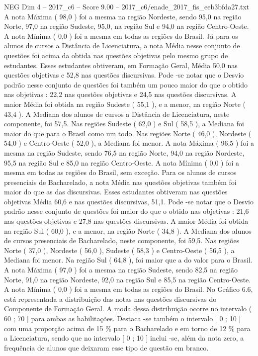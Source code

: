 \begin{textsample}{NEG Dim 4 – 2017\_c6 – Score 9.00 – 2017\_c6/enade\_2017\_fis\_eeb3bfda27.txt}
A nota Máxima ( 98,0 ) foi a mesma na região Nordeste, sendo 95,0 na região Norte, 97,0 na região Sudeste, 95,0, na região Sul e 94,0 na região Centro-Oeste.
A nota Mínima ( 0,0 ) foi a mesma em todas as regiões do Brasil.
Já para os alunos de cursos a Distância de Licenciatura, a nota Média nesse conjunto de questões foi acima da obtida nas questões objetivas pelo mesmo grupo de estudantes.
Esses estudantes obtiveram, em Formação Geral, Média 50,0 nas questões objetivas e 52,8 nas questões discursivas.
Pode -se notar que o Desvio padrão nesse conjunto de questões foi também um pouco maior do que o obtido nas objetivas : 22,2 nas questões objetivas e 24,5 nas questões discursivas.
A maior Média foi obtida na região Sudeste ( 55,1 ), e a menor, na região Norte ( 43,4 ).
A Mediana dos alunos de cursos a Distância de Licenciatura, neste componente, foi 57,5.
Nas regiões Sudeste ( 62,0 ) e Sul ( 58,5 ), a Mediana foi maior do que para o Brasil como um todo.
Nas regiões Norte ( 46,0 ), Nordeste ( 54,0 ) e Centro-Oeste ( 52,0 ), a Mediana foi menor.
A nota Máxima ( 96,5 ) foi a mesma na região Sudeste, sendo 76,5 na região Norte, 94,0 na região Nordeste, 95,5 na região Sul e 85,0 na região Centro-Oeste.
A nota Mínima ( 0,0 ) foi a mesma em todas as regiões do Brasil, sem exceção.
Para os alunos de cursos presenciais de Bacharelado, a nota Média nas questões objetivas também foi maior do que as das discursivas.
Esses estudantes obtiveram nas questões objetivas Média 60,6 e nas questões discursivas, 51,1.
Pode -se notar que o Desvio padrão nesse conjunto de questões foi maior do que o obtido nas objetivas : 21,6 nas questões objetivas e 27,8 nas questões discursivas.
A maior Média foi obtida na região Sul ( 60,0 ), e a menor, na região Norte ( 34,8 ).
A Mediana dos alunos de cursos presenciais de Bacharelado, neste componente, foi 59,5.
Nas regiões Norte ( 37,0 ), Nordeste ( 56,0 ), Sudeste ( 58,3 ) e Centro-Oeste ( 56,5 ), a Mediana foi menor.
Na região Sul ( 64,8 ), foi maior que a do valor para o Brasil.
A nota Máxima ( 97,0 ) foi a mesma na região Sudeste, sendo 82,5 na região Norte, 91,0 na região Nordeste, 92,0 na região Sul e 85,5 na região Centro-Oeste.
A nota Mínima ( 0,0 ) foi a mesma em todas as regiões do Brasil.
No Gráfico 6.6, está representada a distribuição das notas nas questões discursivas do Componente de Formação Geral.
A moda dessa distribuição ocorre no intervalo ( 60 ; 70 ] para ambas as habilitações.
Destaca -se também o intervalo [ 0 ; 10 ] com uma proporção acima de 15 \% para o Bacharelado e em torno de 12 \% para a Licenciatura, sendo que no intervalo [ 0 ; 10 ] inclui -se, além da nota zero, a frequência de alunos que deixaram esse tipo de questão em branco.

\end{textsample}
